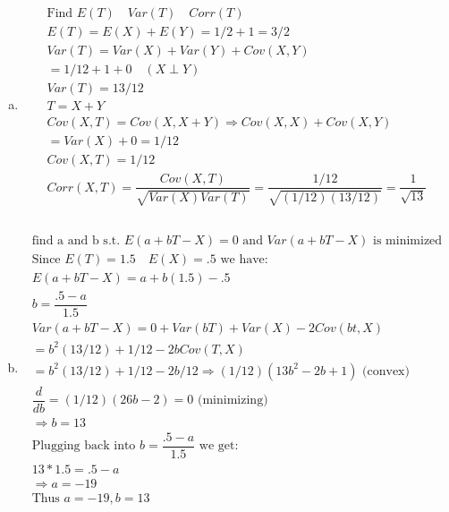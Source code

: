 \documentclass{article}
\newcommand{\ra}{\Rightarrow}
\begin{document}
\begin{flushleft}
\begin{enumerate}[(a)]
	\item 
\begin{multline*}\\
\text{Find } E(T) \quad Var(T) \quad Corr(T)\\
E(T)=E(X)+E(Y)=1/2+1=3/2\\
Var(T)=Var(X)+Var(Y)+Cov(X,Y)\\
=1/12+1+0 \quad (X\perp Y)\\
Var(T)=13/12\\
T=X+Y\\
Cov(X,T)=Cov(X,X+Y)\ra Cov(X,X)+Cov(X,Y)\\
=Var(X)+0=1/12\\
Cov(X,T)=1/12\\
Corr(X,T)=\dfrac{Cov(X,T)}{\sqrt{Var(X)Var(T)}}=\dfrac{1/12}{\sqrt{(1/12) (13/12)}}=\dfrac{1}{\sqrt{13}}\\
\end{multline*}


\item 
\begin{multline*}\\
\text{find a and b s.t. } E(a+bT-X)=0 \text{ and } Var(a+bT-X) \text{ is minimized}\\
\text{Since } E(T)=1.5 \quad E(X)=.5 \text{ we have:}\\
E(a+bT-X)=a+b(1.5)-.5\\
b=\dfrac{.5-a}{1.5}\\
Var(a+bT-X)=0+Var(bT)+Var(X)-2Cov(bt,X)\\
=b^2(13/12)+1/12-2bCov(T,X)\\
=b^2(13/12)+1/12-2b/12\ra (1/12)(13b^2-2b+1) \text{ (convex)}\\
\dfrac{d}{d b}=(1/12)(26b-2)=0 \text{ (minimizing)}\\ 
\ra b=13\\
\text{Plugging back into } b=\dfrac{.5-a}{1.5} \text{ we get:}\\ 
13*1.5=.5-a\\
\ra a=-19\\
\text{Thus } a=-19, b=13\\
\end{multline*}


\end{enumerate}
\end{flushleft}
\end{document}
